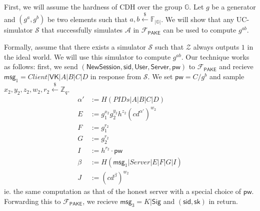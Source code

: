 \documentclass[12pt,a4paper]{article}
\newcommand{\simulator}{\mathcal{S}}
\newcommand{\env}{\mathcal{Z}}
\newcommand{\adv}{\mathcal{A}}
\newcommand{\pake}{\mathcal{F}_{\mathsf{PAKE}}}
\newcommand{\user}{\mathsf{User}}
\newcommand{\sk}{\mathsf{sk}}
\newcommand{\pw}{\mathsf{pw}}
\newcommand{\newsession}{\mathsf{NewSession}}
\newcommand{\server}{\mathsf{Server}}
\newcommand{\msg}[1]{\mathsf{msg}_{#1}}
\begin{document}
	
	
	First, we will assume the hardness of CDH over the group $\mathbb{G}$. Let $g$ be a generator and $(g^a, g^b)$ be two elements such that $a,b\xleftarrow{\$}\mathbb{F}_{|\mathbb{G}|}$. We will show that any UC-simulator $\simulator$ that successfully simulates $\adv$ in $\pake$ can be used to compute $g^{ab}$.
	
	Formally, assume that there exists a simulator $\simulator$ such that $\env$ always outputs $1$ in the ideal world. We will use this simulator to compute $g^{ab}$. Our technique works as follows: first, we send $(\newsession,\mathsf{sid},\user,\server,\pw)$ to $\pake$ and recieve $\msg{1} = Client|\mathsf{VK}|A|B|C|D$ in response from $\simulator$. We set $\pw = C/g^b$ and sample $x_2,y_2,z_2,w_2,r_2\xleftarrow{\$}\mathbb{Z}_q$. 
	\begin{align*}
		\alpha'&:=H(PIDs|A|B|C|D)\\
		E &:= g_1^{x_2}g_2^{y_2}h^{z_2}(cd^{\alpha'})^{w_2}\\
		F &:= g_1^{r_2}\\
		G &:= g_2^{r_2}\\
		I &:= h^{r_2}\cdot\pw\\
		\beta &:= H(\msg{1}|Server|E|F|G|I)\\
		J &:= (cd^{\beta})^{w_2}
	\end{align*}
	ie. the same computation as that of the honest server with a special choice of $\pw$. Forwarding this to $\pake$, we recieve $\msg{3}=K|\mathsf{Sig}$ and $(\mathsf{sid}, \sk)$ in return.
	
	
	
	
	
	\pagebreak
	\appendix
	
%	
%	
	
\end{document}
